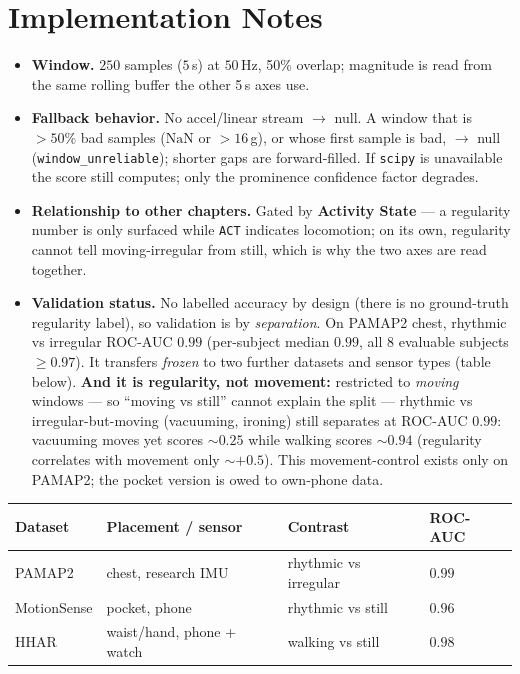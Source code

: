\section{Implementation Notes}

\begin{itemize}[leftmargin=1.4em]
  \item \textbf{Window.} $250$ samples ($5$\,s) at $50$\,Hz, 50\% overlap; magnitude is
  read from the same rolling buffer the other 5\,s axes use.
  \item \textbf{Fallback behavior.} No accel/linear stream $\rightarrow$ null. A window that
  is $>50\%$ bad samples ($\mathrm{NaN}$ or $>16$\,g), or whose first sample is bad,
  $\rightarrow$ null (\texttt{window\_unreliable}); shorter gaps are forward-filled. If
  \texttt{scipy} is unavailable the score still computes; only the prominence confidence
  factor degrades.
  \item \textbf{Relationship to other chapters.} Gated by \textbf{Activity State} --- a
  regularity number is only surfaced while \texttt{ACT} indicates locomotion; on its own,
  regularity cannot tell moving-irregular from still, which is why the two axes are read
  together.
  \item \textbf{Validation status.} No labelled accuracy by design (there is no ground-truth
  regularity label), so validation is by \emph{separation}. On PAMAP2 chest, rhythmic vs
  irregular ROC-AUC $0.99$ (per-subject median $0.99$, all 8 evaluable subjects $\geq 0.97$).
  It transfers \emph{frozen} to two further datasets and sensor types (table below).
  \textbf{And it is regularity, not movement:} restricted to \emph{moving} windows --- so
  ``moving vs still'' cannot explain the split --- rhythmic vs irregular-but-moving
  (vacuuming, ironing) still separates at ROC-AUC $0.99$: vacuuming moves yet scores
  ${\sim}0.25$ while walking scores ${\sim}0.94$ (regularity correlates with movement only
  ${\sim}{+}0.5$). This movement-control exists only on PAMAP2; the pocket version is owed to
  own-phone data.
\end{itemize}

\begin{center}
\begin{tabular}{@{}>{\raggedright\arraybackslash}p{2.4cm} >{\raggedright\arraybackslash}p{3.6cm} >{\raggedright\arraybackslash}p{3.4cm} l@{}}
\toprule
\textbf{Dataset} & \textbf{Placement / sensor} & \textbf{Contrast} & \textbf{ROC-AUC} \\
\midrule
PAMAP2      & chest, research IMU        & rhythmic vs irregular & $0.99$ \\
MotionSense & pocket, phone              & rhythmic vs still     & $0.96$ \\
HHAR        & waist/hand, phone + watch  & walking vs still      & $0.98$ \\
\bottomrule
\end{tabular}
\end{center}

